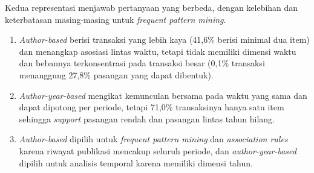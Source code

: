 Kedua representasi menjawab pertanyaan yang berbeda, dengan kelebihan dan keterbatasan masing-masing untuk \textit{frequent pattern mining}.
\begin{enumerate}
\item \textit{Author-based} berisi transaksi yang lebih kaya (41,6\% berisi minimal dua item) dan menangkap asosiasi lintas waktu, tetapi tidak memiliki dimensi waktu dan bebannya terkonsentrasi pada transaksi besar (0,1\% transaksi menanggung 27,8\% pasangan yang dapat dibentuk).
\item \textit{Author-year-based} mengikat kemunculan bersama pada waktu yang sama dan dapat dipotong per periode, tetapi 71,0\% transaksinya hanya satu item sehingga \textit{support} pasangan rendah dan pasangan lintas tahun hilang.
\item \textit{Author-based} dipilih untuk \textit{frequent pattern mining} dan \textit{association rules} karena riwayat publikasi mencakup seluruh periode, dan \textit{author-year-based} dipilih untuk analisis temporal karena memiliki dimensi tahun.
\end{enumerate}
